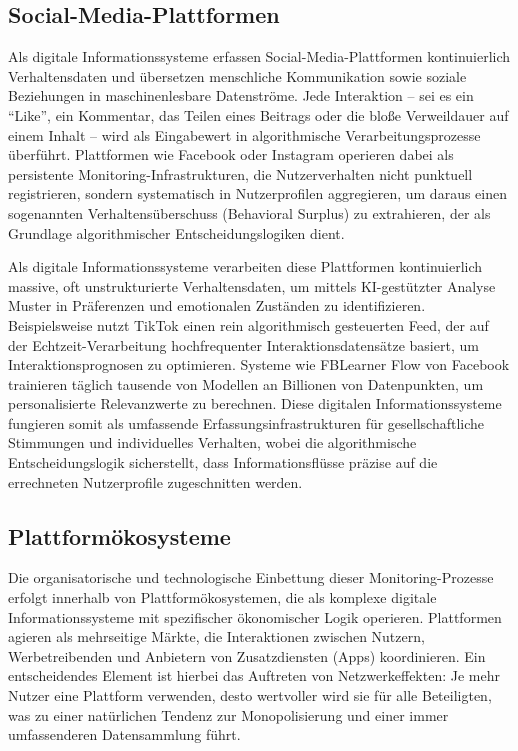 \subsection{Social-Media-Plattformen}

Als digitale Informationssysteme erfassen Social-Media-Plattformen kontinuierlich Verhaltensdaten und übersetzen menschliche Kommunikation sowie soziale Beziehungen in maschinenlesbare Datenströme. Jede Interaktion -- sei es ein \enquote{Like}, ein Kommentar, das Teilen eines Beitrags oder die bloße Verweildauer auf einem Inhalt -- wird als Eingabewert in algorithmische Verarbeitungsprozesse überführt. Plattformen wie Facebook oder Instagram operieren dabei als persistente Monitoring-Infrastrukturen, die Nutzerverhalten nicht punktuell registrieren, sondern systematisch in Nutzerprofilen aggregieren, um daraus einen sogenannten Verhaltensüberschuss (Behavioral Surplus) zu extrahieren, der als Grundlage algorithmischer Entscheidungslogiken dient.

Als digitale Informationssysteme verarbeiten diese Plattformen kontinuierlich massive, oft unstrukturierte Verhaltensdaten, um mittels \ac{KI}-gestützter Analyse Muster in Präferenzen und emotionalen Zuständen zu identifizieren. Beispielsweise nutzt TikTok einen rein algorithmisch gesteuerten Feed, der auf der Echtzeit-Verarbeitung hochfrequenter Interaktionsdatensätze basiert, um Interaktionsprognosen zu optimieren. Systeme wie FBLearner Flow von Facebook trainieren täglich tausende von Modellen an Billionen von Datenpunkten, um personalisierte Relevanzwerte zu berechnen. Diese digitalen Informationssysteme fungieren somit als umfassende Erfassungsinfrastrukturen für gesellschaftliche Stimmungen und individuelles Verhalten, wobei die algorithmische Entscheidungslogik sicherstellt, dass Informationsflüsse präzise auf die errechneten Nutzerprofile zugeschnitten werden.

\subsection{Plattformökosysteme}

Die organisatorische und technologische Einbettung dieser Monitoring-Prozesse erfolgt innerhalb von Plattformökosystemen, die als komplexe digitale Informationssysteme mit spezifischer ökonomischer Logik operieren. Plattformen agieren als mehrseitige Märkte, die Interaktionen zwischen Nutzern, Werbetreibenden und Anbietern von Zusatzdiensten (Apps) koordinieren. Ein entscheidendes Element ist hierbei das Auftreten von Netzwerkeffekten: Je mehr Nutzer eine Plattform verwenden, desto wertvoller wird sie für alle Beteiligten, was zu einer natürlichen Tendenz zur Monopolisierung und einer immer umfassenderen Datensammlung führt.

